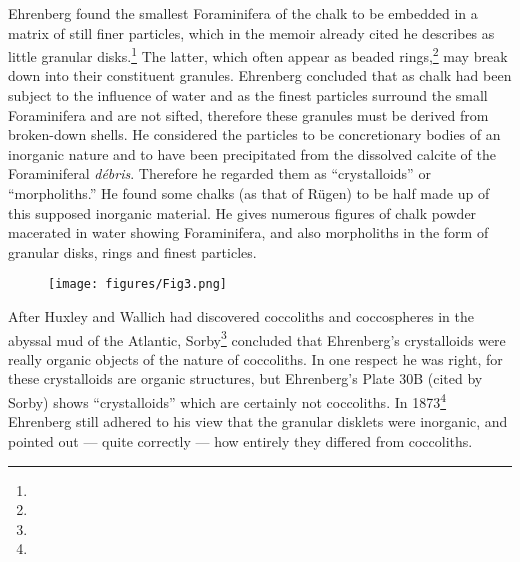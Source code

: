 \documentclass[a4paper, 12pt, oneside]{article}
\begin{document}
Ehrenberg found the smallest Foraminifera of the chalk to be embedded in a matrix of still finer particles, which in the memoir already cited he describes as little granular disks.\footnote{} The latter, which often appear as beaded rings,\footnote{} may break down into their constituent granules. Ehrenberg concluded that as chalk had been subject to the influence of water and as the finest particles surround the small Foraminifera and are not sifted, therefore these granules must be derived from broken-down shells. He considered the particles to be concretionary bodies of an inorganic nature and to have been precipitated from the dissolved calcite of the Foraminiferal \emph{débris}. Therefore he regarded them as ``crystalloids'' or ``morpholiths.'' He found some chalks (as that of Rügen) to be half made up of this supposed inorganic material. He gives numerous figures of chalk powder macerated in water showing Foraminifera, and also morpholiths in the form of granular disks, rings and finest particles.
\begin{figure}[H]
\centering
\texttt{[image: figures/Fig3.png]}
\caption*{}
\end{figure}
After Huxley and Wallich had discovered coccoliths and coccospheres in the abyssal mud of the Atlantic, Sorby\footnote{} concluded that Ehrenberg's crystalloids were really organic objects of the nature of coccoliths. In one respect he was right, for these crystalloids are organic structures, but Ehrenberg's Plate 30B (cited by Sorby) shows ``crystalloids'' which are certainly not coccoliths. In 1873\footnote{} Ehrenberg still adhered to his view that the granular disklets were inorganic, and pointed out --- quite correctly --- how entirely they differed from coccoliths.
\end{document}

